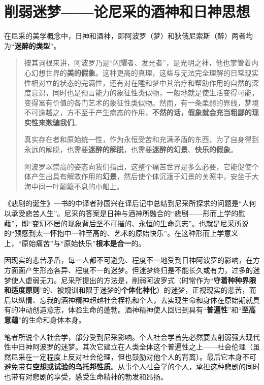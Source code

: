 \chapter{削弱迷梦------论尼采的酒神和日神思想}
\label{chap:nicai}

在尼采的美学概念中，日神和酒神，即阿波罗（梦）和狄俄尼索斯（醉）两者均为“\textbf{迷醉的类型}”。

\begin{quotation}按其词根来讲，阿波罗乃是“闪耀者、发光者”，是光明之神，他也掌管着内心幻想世界的\textbf{美的假象}。这种更高的真理，这些与无法完全理解的日常现实性相对立的状态的完满性，还有对在睡和梦中其治疗和帮助作用的自然的深度意识，同时也是预言能力的象征性类似物，一般地就是使生活变得可能，变得富有价值的各门艺术的象征性类似物。然而，有一条柔弱的界线，梦境不可逾越之，方不至于产生病态的作用，\textbf{不然的话，假象就会充当粗鄙的现实性来欺骗我们}。

  真实存在者和原始统一性，作为永恒受苦和充满矛盾的东西，为了自身得到永远的解脱，也需要\textbf{迷醉的解脱}，也需要\textbf{迷醉的幻景}、\textbf{快乐的假象}。

  阿波罗以崇高的姿态向我们指出，这整个痛苦世界是多么必要，它能促使个体产生出具有解救作用的\textbf{幻景}，然后使个体沉湎于幻景的关照中，安坐于大海中间一叶颠簸不息的小船上。\cite{beijudansheng}
\end{quotation}

《悲剧的诞生》一书的中译者孙国兴在译后记中总结到尼采所探求的问题是“人何以承受悲苦人生”。尼采的答案是日神与酒神所融合的“悲剧——形而上学的慰藉”，即“变幻不居的现象背后坚不可摧的、永恒的生命意志”。也就是尼采所说的“预感到太一怀抱中一种至高的、艺术的原始快乐”。在这种形而上学意义上，“原始痛苦”与“原始快乐”\textbf{根本是合一}的。

因现实的悲苦矛盾，每一人都不可避免、程度不一地受到日神阿波罗的影响，在方方面面产生形态各异、程度不一的迷梦。但迷梦终归是不能长久或有力，过多的迷梦使人虚弱无力。尼采所提出的方法是，削弱阿波罗式（时常作为“\textbf{守着种种界限和适度原则}”的、被规训和限于迷梦的\textbf{个体化神化}）的迷梦，正视现实的悲苦，而后以纵情、忘我的酒神精神超越社会桎梏和个人，去实现生命和身体在原始期就具有的冲动创造意志，体验生命的蓬勃。酒神精神使人回归到具有“\textbf{普遍性}”和“\textbf{至高意蕴}”的生命和身体本身。

笔者所说个人社会学，部分受到尼采影响。个人社会学首先必然要去削弱强大现代性中日神阿波罗的迷梦。其次它建立在人类全体这个普遍性之上——社会伦理（虽然尼采在一定程度上反对社会伦理，但也鼓励对他个人的背离）。最后它本身不可避免带有\textbf{空想或试验的乌托邦性质}。从事个人社会学的个人，承担这种悲剧的同时也带有对悲剧的享受，感受生命精神的勃发和昂扬。
